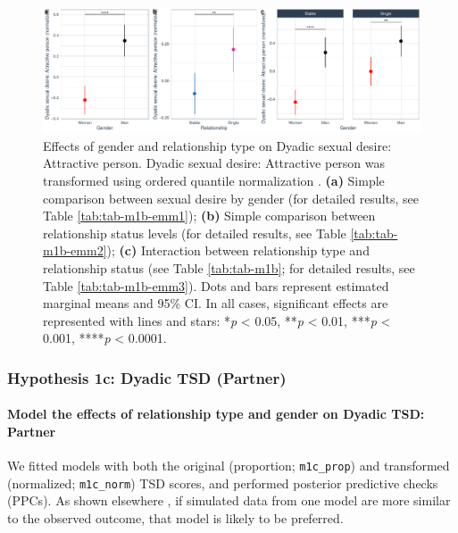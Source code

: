 \documentclass[
  bookmarksnumbered]{article}
\begin{document}
\begin{figure}
\centering
\includegraphics{Sexual_Desire_Arousal_V2_files/figure-latex/fig-h1b-1.pdf}
\caption{\label{fig:fig-h1b}Effects of gender and relationship type on Dyadic sexual desire: Attractive person. Dyadic sexual desire: Attractive person was transformed using ordered quantile normalization \autocite{petersonOrderedQuantileNormalization2020a}. \textbf{(a)} Simple comparison between sexual desire by gender (for detailed results, see Table \ref{tab:tab-m1b-emm1}); \textbf{(b)} Simple comparison between relationship status levels (for detailed results, see Table \ref{tab:tab-m1b-emm2}); \textbf{(c)} Interaction between relationship type and relationship status (see Table \ref{tab:tab-m1b}; for detailed results, see Table \ref{tab:tab-m1b-emm3}). Dots and bars represent estimated marginal means and 95\% CI. In all cases, significant effects are represented with lines and stars: *\emph{p} \textless{} 0.05, **\emph{p} \textless{} 0.01, ***\emph{p} \textless{} 0.001, ****\emph{p} \textless{} 0.0001.}
\end{figure}

\subsubsection{Hypothesis 1c: Dyadic TSD (Partner)}\label{hypothesis1c}

\paragraph{Model the effects of relationship type and gender on Dyadic TSD: Partner}\label{model-the-effects-of-relationship-type-and-gender-on-dyadic-tsd-partner}

We fitted models with both the original (proportion; \texttt{m1c\_prop}) and transformed (normalized; \texttt{m1c\_norm}) TSD scores, and performed posterior predictive checks (PPCs). As shown elsewhere \autocite[e.g.,][]{gabryVisualizationBayesianWorkflow2019}, if simulated data from one model are more similar to the observed outcome, that model is likely to be preferred.
\end{document}
